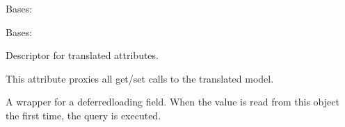 \documentclass[letterpaper,10pt,english]{sphinxmanual}
\begin{document}
\begin{fulllineitems}
\begin{fulllineitems}
\end{fulllineitems}


\begin{fulllineitems}
\label{\detokenize{index:core.models.LaundryInfo.DoesNotExist}}
\pysigstartsignatures
\pysigline
{}
\pysigstopsignatures
\sphinxAtStartPar
Bases: 

\end{fulllineitems}


\begin{fulllineitems}
\label{\detokenize{index:core.models.LaundryInfo.MultipleObjectsReturned}}
\pysigstartsignatures
\pysigline
{}
\pysigstopsignatures
\sphinxAtStartPar
Bases: 

\end{fulllineitems}


\begin{fulllineitems}
\label{\detokenize{index:core.models.LaundryInfo.dryer_price}}
\pysigstartsignatures
\pysigline
{}
\pysigstopsignatures
\sphinxAtStartPar
Descriptor for translated attributes.

\sphinxAtStartPar
This attribute proxies all get/set calls to the translated model.

\end{fulllineitems}


\begin{fulllineitems}
\label{\detokenize{index:core.models.LaundryInfo.id}}
\pysigstartsignatures
\pysigline
{}
\pysigstopsignatures
\sphinxAtStartPar
A wrapper for a deferred\sphinxhyphen{}loading field. When the value is read from this
object the first time, the query is executed.


\end{fulllineitems}
\end{fulllineitems}
\end{document}
